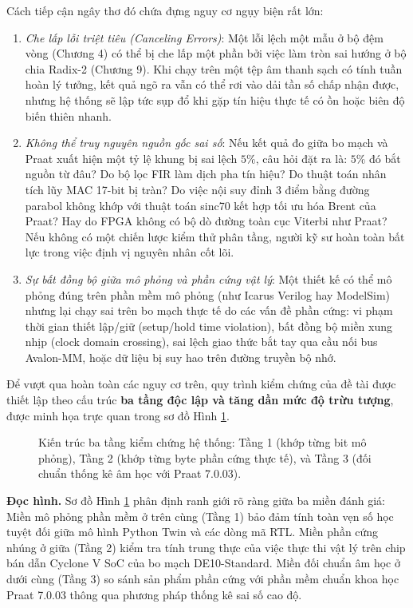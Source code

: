 Cách tiếp cận ngây thơ đó chứa đựng nguy cơ ngụy biện rất lớn:
\begin{enumerate}
    \item \emph{Che lấp lỗi triệt tiêu (Canceling Errors)}: Một lỗi lệch một mẫu ở bộ đệm vòng (Chương 4) có thể bị che lấp một phần bởi việc làm tròn sai hướng ở bộ chia Radix-2 (Chương 9). Khi chạy trên một tệp âm thanh sạch có tính tuần hoàn lý tưởng, kết quả ngõ ra vẫn có thể rơi vào dải tần số chấp nhận được, nhưng hệ thống sẽ lập tức sụp đổ khi gặp tín hiệu thực tế có ồn hoặc biên độ biến thiên nhanh.
    \item \emph{Không thể truy nguyên nguồn gốc sai số}: Nếu kết quả đo giữa bo mạch và Praat xuất hiện một tỷ lệ khung bị sai lệch $5\%$, câu hỏi đặt ra là: $5\%$ đó bắt nguồn từ đâu? Do bộ lọc FIR làm dịch pha tín hiệu? Do thuật toán nhân tích lũy MAC 17-bit bị tràn? Do việc nội suy đỉnh 3 điểm bằng đường parabol không khớp với thuật toán sinc70 kết hợp tối ưu hóa Brent của Praat? Hay do FPGA không có bộ dò đường toàn cục Viterbi như Praat? Nếu không có một chiến lược kiểm thử phân tầng, người kỹ sư hoàn toàn bất lực trong việc định vị nguyên nhân cốt lõi.
    \item \emph{Sự bất đồng bộ giữa mô phỏng và phần cứng vật lý}: Một thiết kế có thể mô phỏng đúng trên phần mềm mô phỏng (như Icarus Verilog hay ModelSim) nhưng lại chạy sai trên bo mạch thực tế do các vấn đề phần cứng: vi phạm thời gian thiết lập/giữ (setup/hold time violation), bất đồng bộ miền xung nhịp (clock domain crossing), sai lệch giao thức bắt tay qua cầu nối bus Avalon-MM, hoặc dữ liệu bị suy hao trên đường truyền bộ nhớ.
\end{enumerate}

Để vượt qua hoàn toàn các nguy cơ trên, quy trình kiểm chứng của đề tài được thiết lập theo cấu trúc \textbf{ba tầng độc lập và tăng dần mức độ trừu tượng}, được minh họa trực quan trong sơ đồ Hình \ref{fig:ch13_three_tiers}.

\begin{figure}[htbp]
\centering

\caption{Kiến trúc ba tầng kiểm chứng hệ thống: Tầng 1 (khớp từng bit mô phỏng), Tầng 2 (khớp từng byte phần cứng thực tế), và Tầng 3 (đối chuẩn thống kê âm học với Praat 7.0.03).}
\label{fig:ch13_three_tiers}
\end{figure}

\textbf{Đọc hình.} Sơ đồ Hình \ref{fig:ch13_three_tiers} phân định ranh giới rõ ràng giữa ba miền đánh giá: Miền mô phỏng phần mềm ở trên cùng (Tầng 1) bảo đảm tính toàn vẹn số học tuyệt đối giữa mô hình Python Twin và các dòng mã RTL. Miền phần cứng nhúng ở giữa (Tầng 2) kiểm tra tính trung thực của việc thực thi vật lý trên chip bán dẫn Cyclone V SoC của bo mạch DE10-Standard. Miền đối chuẩn âm học ở dưới cùng (Tầng 3) so sánh sản phẩm phần cứng với phần mềm chuẩn khoa học Praat 7.0.03 thông qua phương pháp thống kê sai số cao độ.

